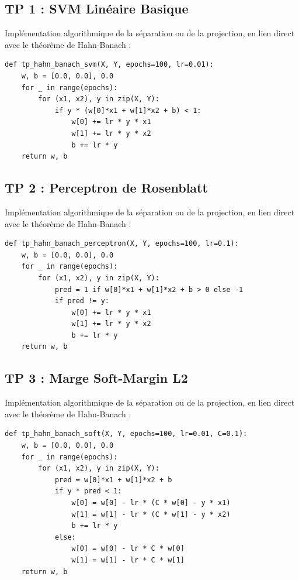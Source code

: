 \documentclass[11pt,a4paper]{article}
\begin{document}
\subsection*{TP 1 : SVM Linéaire Basique}

Implémentation algorithmique de la séparation ou de la projection, en lien direct avec le théorème de Hahn-Banach :

\begin{lstlisting}
def tp_hahn_banach_svm(X, Y, epochs=100, lr=0.01):
    w, b = [0.0, 0.0], 0.0
    for _ in range(epochs):
        for (x1, x2), y in zip(X, Y):
            if y * (w[0]*x1 + w[1]*x2 + b) < 1:
                w[0] += lr * y * x1
                w[1] += lr * y * x2
                b += lr * y
    return w, b
\end{lstlisting}


\subsection*{TP 2 : Perceptron de Rosenblatt}

Implémentation algorithmique de la séparation ou de la projection, en lien direct avec le théorème de Hahn-Banach :

\begin{lstlisting}
def tp_hahn_banach_perceptron(X, Y, epochs=100, lr=0.1):
    w, b = [0.0, 0.0], 0.0
    for _ in range(epochs):
        for (x1, x2), y in zip(X, Y):
            pred = 1 if w[0]*x1 + w[1]*x2 + b > 0 else -1
            if pred != y:
                w[0] += lr * y * x1
                w[1] += lr * y * x2
                b += lr * y
    return w, b
\end{lstlisting}


\subsection*{TP 3 : Marge Soft-Margin L2}

Implémentation algorithmique de la séparation ou de la projection, en lien direct avec le théorème de Hahn-Banach :

\begin{lstlisting}
def tp_hahn_banach_soft(X, Y, epochs=100, lr=0.01, C=0.1):
    w, b = [0.0, 0.0], 0.0
    for _ in range(epochs):
        for (x1, x2), y in zip(X, Y):
            pred = w[0]*x1 + w[1]*x2 + b
            if y * pred < 1:
                w[0] = w[0] - lr * (C * w[0] - y * x1)
                w[1] = w[1] - lr * (C * w[1] - y * x2)
                b += lr * y
            else:
                w[0] = w[0] - lr * C * w[0]
                w[1] = w[1] - lr * C * w[1]
    return w, b
\end{lstlisting}
\end{document}
